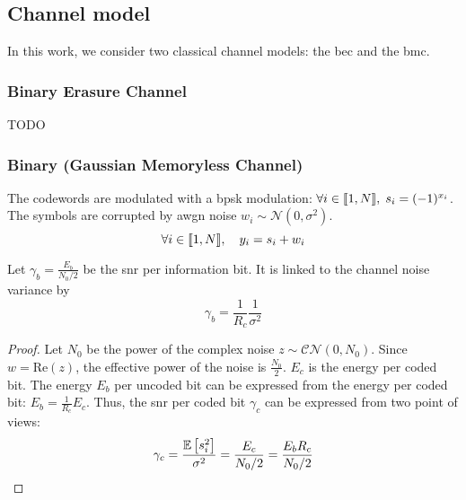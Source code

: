\subsection{Channel model}
In this work, we consider two classical channel models: the \acrlong{bec} and
the \acrlong{bmc}.

\subsubsection{Binary Erasure Channel}
TODO

\subsubsection{Binary (Gaussian Memoryless Channel)}
The codewords are modulated with a \acrshort{bpsk} modulation: $\forall i \in
    {\left\llbracket 1, N \right\rrbracket}, \; s_i = (-1)^{x_i}$. The symbols are corrupted by
\acrshort{awgn} noise $w_i \sim \mathcal{N}\left(0, \sigma^2\right)$.
\begin{equation}
    \forall i \in {\left\llbracket 1, N \right\rrbracket}, \quad
    y_i = s_i + w_i
\end{equation}

\begin{iproposition}
    Let $\gamma_b = \frac{E_b}{N_0/2}$ be the \acrshort{snr} per information bit. It is linked to the channel noise variance by
    \begin{equation}
        \gamma_b = \frac{1}{R_c} \frac{1}{\sigma^2}
    \end{equation}
\end{iproposition}

\begin{proof}
    Let $N_0$ be the power of the complex noise $z \sim \mathcal{CN}(0, N_0)$.
    Since $w = \text{Re}(z)$, the effective power of the noise is
    $\frac{N_0}{2}$. $E_c$ is the energy per coded bit. The energy
    $E_b$ per uncoded bit can be expressed from the energy per coded bit: $E_b =
        \frac{1}{R_c} E_c$. Thus, the \acrshort{snr} per coded bit $\gamma_c$ can be
    expressed from two point of views:
    \begin{equation}
        \gamma_c = \frac{\E{s_i^2}}{\sigma^2} = \frac{E_c}{N_0 / 2} = \frac{E_b R_c}{N_0 / 2}
    \end{equation}
\end{proof}


